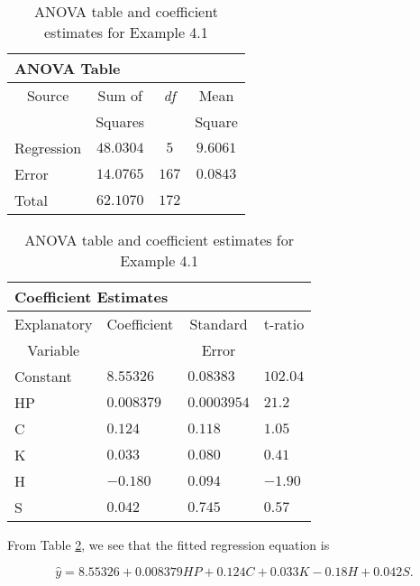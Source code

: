   \begin{center}  \begin{table}[h]
\begin{tabular}{cccc}
\multicolumn{2}{l}{ANOVA Table} &  &  \\ \hline
Source & Sum of & \textit{df} & Mean \\
& Squares &  & Square \\ \hline
\multicolumn{1}{l}{Regression} & $48.0304$ & $5$ & $9.6061$ \\
\multicolumn{1}{l}{Error} & $14.0765$ & $167$ & $0.0843$ \\
\multicolumn{1}{l}{Total} & $62.1070$ & $172$ &  \\ \hline
\end{tabular}%
\begin{tabular}{cccc}
\multicolumn{2}{l}{Coefficient Estimates} &  &  \\ \hline
Explanatory & Coefficient & Standard & t-ratio \\
Variable &  & Error &  \\ \hline
\multicolumn{1}{l}{Constant} & \multicolumn{1}{l}{$8.55326$} &
\multicolumn{1}{l}{$0.08383$} & \multicolumn{1}{l}{$102.04$} \\
\multicolumn{1}{l}{HP} & \multicolumn{1}{l}{$0.008379$} &
\multicolumn{1}{l}{$0.0003954$} & \multicolumn{1}{l}{$21.2$} \\
\multicolumn{1}{l}{C} & \multicolumn{1}{l}{$0.124$} & \multicolumn{1}{l}{$%
0.118$} & \multicolumn{1}{l}{$1.05$} \\
\multicolumn{1}{l}{K} & \multicolumn{1}{l}{$0.033$} & \multicolumn{1}{l}{$%
0.080$} & \multicolumn{1}{l}{$0.41$} \\
\multicolumn{1}{l}{H} & \multicolumn{1}{l}{$-0.180$} & \multicolumn{1}{l}{$%
0.094$} & \multicolumn{1}{l}{$-1.90$} \\
\multicolumn{1}{l}{S} & \multicolumn{1}{l}{$0.042$} & \multicolumn{1}{l}{$%
0.745$} & \multicolumn{1}{l}{$0.57$} \\ \hline
\end{tabular}

\caption{\label{T4:ANOVACarPrice} ANOVA table and coefficient
estimates for Example 4.1}

\end{table}  \end{center}  

From Table \ref{T4:ANOVACarPrice}, we see that the fitted regression
equation is

\begin{equation*}
\widehat{y}=8.55326+0.008379HP+0.124C+0.033K-0.18H+0.042S.
\end{equation*}

